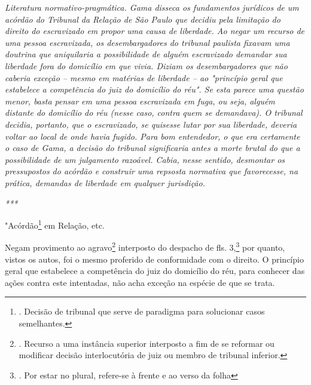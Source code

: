 \emph{Literatura normativo-pragmática. Gama disseca os fundamentos
jurídicos de um acórdão do Tribunal da Relação de São Paulo que decidiu
pela limitação do direito do escravizado em propor uma causa de
liberdade. Ao negar um recurso de uma pessoa escravizada, os
desembargadores do tribunal paulista fixavam uma doutrina que
aniquilaria a possibilidade de alguém escravizado demandar sua liberdade
fora do domicílio em que vivia. Diziam os desembargadores que não
caberia exceção -- mesmo em matérias de liberdade -- ao "princípio geral
que estabelece a competência do juiz do domicílio do réu". Se esta
parece uma questão menor, basta pensar em uma pessoa escravizada em
fuga, ou seja, alguém distante do domicílio do réu (nesse caso, contra
quem se demandava). O tribunal decidia, portanto, que o escravizado, se
quisesse lutar por sua liberdade, deveria voltar ao local de onde havia
fugido. Para bom entendedor, o que era certamente o caso de Gama, a
decisão do tribunal significaria antes a morte brutal do que a
possibilidade de um julgamento razoável. Cabia, nesse sentido, desmontar
os pressupostos do acórdão e construir uma repsosta normativa que
favorecesse, na prática, demandas de liberdade em qualquer jurisdição. }

\emph{***}

"Acórdão\footnote{. Decisão de tribunal que serve de paradigma para
  solucionar casos semelhantes.} em Relação, etc.

Negam provimento ao agravo\footnote{. Recurso a uma instância superior
  interposto a fim de se reformar ou modificar decisão interlocutória de
  juiz ou membro de tribunal inferior.} interposto do despacho de fls.
3,\footnote{. Por estar no plural, refere-se à frente e ao verso da
  folha} por quanto, vistos os autos, foi o mesmo proferido de
conformidade com o direito. O princípio geral que estabelece a
competência do juiz do domicílio do réu, para conhecer das ações contra
este intentadas, não acha exceção na espécie de que se trata.

